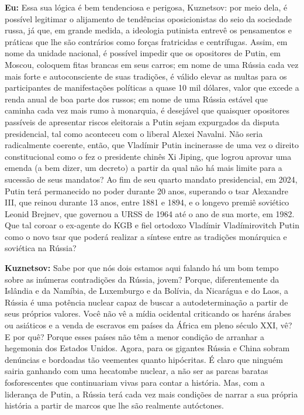 \textbf{Eu:} Essa sua lógica é bem tendenciosa e perigosa, Kuznetsov:
por meio dela, é possível legitimar o alijamento de tendências
oposicionistas do seio da sociedade russa, já que, em grande medida, a
ideologia putinista entrevê os pensamentos e práticas que lhe são
contrários como forças fratricidas e centrífugas. Assim, em nome da
unidade nacional, é possível impedir que os opositores de Putin, em
Moscou, coloquem fitas brancas em seus carros; em nome de uma Rússia
cada vez mais forte e autoconsciente de suas tradições, é válido elevar
as multas para os participantes de manifestações políticas a quase 10
mil dólares, valor que excede a renda anual de boa parte dos russos; em
nome de uma Rússia estável que caminha cada vez mais rumo à monarquia, é
desejável que quaisquer opositores passíveis de apresentar riscos
eleitorais a Putin sejam expurgados da disputa presidencial, tal como
aconteceu com o liberal Alexei Navalni. Não seria radicalmente coerente,
então, que Vladímir Putin incinerasse de uma vez o direito
constitucional como o fez o presidente chinês Xi Jiping, que logrou
aprovar uma emenda (a bem dizer, um decreto) a partir da qual não há
mais limite para a sucessão de seus mandatos? Ao fim de seu quarto
mandato presidencial, em 2024, Putin terá permanecido no poder durante
20 anos, superando o tsar Alexandre III, que reinou durante 13 anos,
entre 1881 e 1894, e o longevo premiê soviético Leonid Brejnev, que
governou a URSS de 1964 até o ano de sua morte, em 1982. Que tal coroar
o ex-agente do KGB e fiel ortodoxo Vladímir Vladímirovitch Putin como o
novo tsar que poderá realizar a síntese entre as tradições monárquica e
soviética na Rússia?

\textbf{Kuznetsov:} Sabe por que nós dois estamos aqui falando há um bom
tempo sobre as inúmeras contradições da Rússia, jovem? Porque,
diferentemente da Islândia e da Namíbia, de Luxemburgo e da Bolívia, da
Nicarágua e do Laos, a Rússia é uma potência nuclear capaz de buscar a
autodeterminação a partir de seus próprios valores. Você não vê a mídia
ocidental criticando os haréns árabes ou asiáticos e a venda de escravos
em países da África em pleno século XXI, vê? E por quê? Porque esses
países não têm a menor condição de arranhar a hegemonia dos Estados
Unidos. Agora, para os gigantes Rússia e China sobram denúncias e
bordoadas tão veementes quanto hipócritas. É claro que ninguém sairia
ganhando com uma hecatombe nuclear, a não ser as parcas baratas
fosforescentes que continuariam vivas para contar a história. Mas, com a
liderança de Putin, a Rússia terá cada vez mais condições de narrar a
sua própria história a partir de marcos que lhe são realmente
autóctones.

